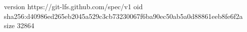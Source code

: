 version https://git-lfs.github.com/spec/v1
oid sha256:d40986ed265eb2045a529c3cb73230067f6ba90ec50ab5a0d88861eeb8fe6f2a
size 32864
